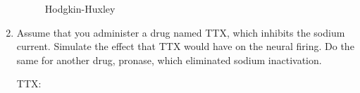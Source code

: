 \documentclass[11pt]{article}
\begin{document}
\begin{enumerate}
		\begin{figure}[ht]
			\centering
			\caption{Hodgkin-Huxley}
		\end{figure}
		
		\item Assume that you administer a drug named TTX, which inhibits the sodium current. Simulate the effect that TTX would have on the neural firing. Do the same for another drug, pronase, which eliminated sodium inactivation.
		
		TTX:
		

\end{enumerate}
\end{document}
